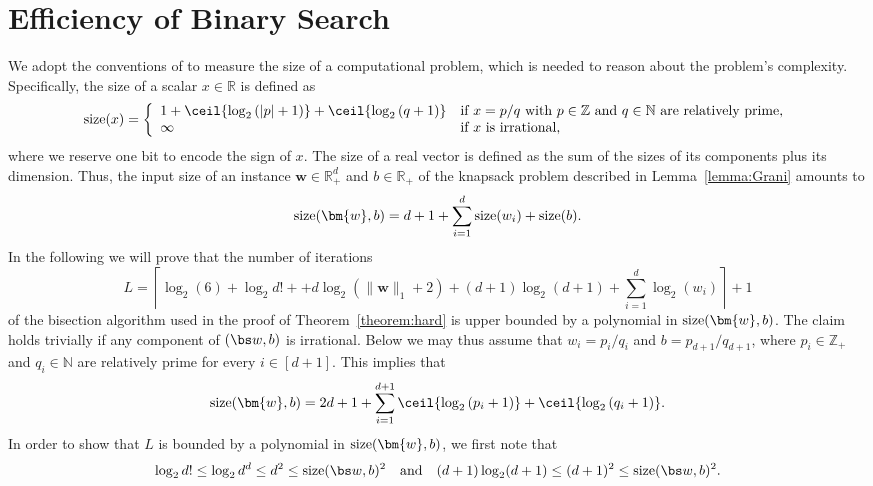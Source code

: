 \documentclass[11pt, a4paper, oneside, reqno]{article}
\begin{document}
	\section{Efficiency of Binary Search}
	\label{appendix:polynomial_calls}
	\renewcommand\thesection{\Alph{section}}
	We adopt the conventions of \citet[\S~2.1]{schrijver1998theory} to measure the size of a computational problem, which is needed to reason about the problem's complexity. Specifically, the size of a scalar $x\in\mathbb R$ is defined as
	\begin{equation*}
	{\rm{size}}(x) = \left\{\begin{array}{ll} 1 + \ceil{\log_2{(|p|+1)}} + \ceil{\log_2{(q+1)}} & \text{if $x= p/q$ with $p\in\mathbb Z$ and $q\in\mathbb N$ are relatively prime,}\\
	\infty & \text{if $x$ is irrational,}
	\end{array}
	\right.
	\end{equation*}
	where we reserve one bit to encode the sign of $x$. The size of a real vector is defined as the sum of the sizes of its components plus its dimension. Thus, the input size of an instance $\bm w\in \mathbb{R}_+^d$ and $b\in\mathbb R_+$ of the knapsack problem described in Lemma~\ref{lemma:Grani} amounts to
	\begin{equation*}
	{\rm{size}}(\bm {w}, b) = d +  1+\sum_{i=1}^d{{\rm{size}}(w_i)}+ {\rm{size}}(b).
	\end{equation*}
	In the following we will prove that the number of iterations
 	{\color{black}
    \[L = \left\lceil   
    \log_2(6) + \log_2 d! + + d \log_2(\|\bm w \|_1 + 2) + (d+1) \log_2(d+1) + \sum\limits_{i=1}^d \log_2(w_i) \right\rceil + 1\]
	of the bisection algorithm used in the proof of Theorem~\ref{theorem:hard} is upper bounded by a polynomial in ${\rm{size}}(\bm {w}, b)$.} The claim holds trivially if any component of $(\bs w,b)$ is irrational.
	Below we may thus assume that $w_i = p_i / q_i$ and $b = p_{d+1}/q_{d+1}$, where $p_i\in\mathbb Z_+$ and $q_i\in\mathbb N$ are relatively prime for every $i\in[d+1]$. This implies that
	\begin{equation*}
	{\rm{size}}(\bm {w}, b) =2 d + 1+  \sum_{i=1}^{d+1}{\ceil{\log_2{(p_i+1)}} + \ceil{\log_2{(q_i+1)}} }. 
	\end{equation*}
	In order to show that $L$ is bounded by a polynomial in ${\rm{size}}(\bm {w}, b)$, we first note that
	\begin{equation}
	\label{eq:ineq-1}
	\log_2 d!\leq \log_2 d^d\leq d^2\leq \text{size}(\bs w, b)^2\quad \text{and}\quad (d+1) \log_2(d+1) \leq (d+1)^2 \leq \text{size}(\bs w, b)^2.
	\end{equation}
\end{document}
